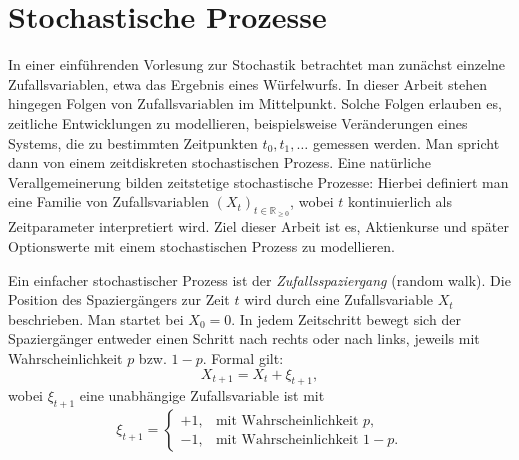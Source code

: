 \section{Stochastische Prozesse}

In einer einführenden Vorlesung zur Stochastik betrachtet man zunächst einzelne Zufallsvariablen, 
etwa das Ergebnis eines Würfelwurfs. In dieser Arbeit stehen hingegen Folgen von 
Zufallsvariablen im Mittelpunkt. Solche Folgen erlauben es, zeitliche Entwicklungen zu modellieren,
beispielsweise Veränderungen eines Systems, die zu bestimmten Zeitpunkten $t_0, t_1, \dots$ gemessen werden.
Man spricht dann von einem zeitdiskreten stochastischen Prozess. Eine natürliche 
Verallgemeinerung bilden zeitstetige stochastische Prozesse: Hierbei definiert man eine 
Familie von Zufallsvariablen $(X_t)_{t \in \mathbb{R}_{\ge 0}}$, wobei $t$ kontinuierlich als 
Zeitparameter interpretiert wird. Ziel dieser Arbeit ist es, Aktienkurse und später Optionswerte mit einem stochastischen Prozess 
zu modellieren.

\begin{bsp}[Zufallsspaziergang]
Ein einfacher stochastischer Prozess ist der \textit{Zufallsspaziergang} (random walk).
Die Position des Spaziergängers zur Zeit $t$ wird durch eine Zufallsvariable $X_t$ beschrieben. 
Man startet bei $X_0 = 0$. In jedem Zeitschritt bewegt sich der Spaziergänger entweder 
einen Schritt nach rechts oder nach links, jeweils mit Wahrscheinlichkeit $p$ bzw. $1-p$. 
Formal gilt:
$$
X_{t+1} = X_t + \xi_{t+1},
$$
wobei $\xi_{t+1}$ eine unabhängige Zufallsvariable ist mit
$$
\xi_{t+1} = 
\begin{cases} 
+1, & \text{mit Wahrscheinlichkeit } p, \\
-1, & \text{mit Wahrscheinlichkeit } 1-p.
\end{cases}
$$

\end{bsp}

